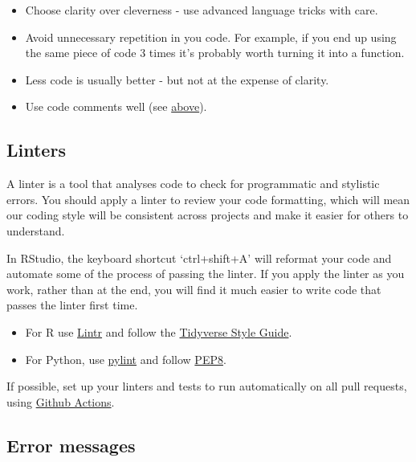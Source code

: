 \documentclass[]{book}
\providecommand{\tightlist}{%
  \setlength{\itemsep}{0pt}\setlength{\parskip}{0pt}}
\begin{document}
\begin{itemize}
\tightlist
\item
  Choose clarity over cleverness - use advanced language tricks with care.
\item
  Avoid unnecessary repetition in you code. For example, if you end up using the same piece of code 3 times it's probably worth turning it into a function.\\
\item
  Less code is usually better - but not at the expense of clarity.\\
\item
  Use code comments well (see \protect\hyperlink{readme}{above}).
\end{itemize}

\hypertarget{linter}{%
\subsection*{Linters}\label{linter}}

A linter is a tool that analyses code to check for programmatic and stylistic errors. You should apply a linter to review your code formatting, which will mean our coding style will be consistent across projects and make it easier for others to understand.

In RStudio, the keyboard shortcut `ctrl+shift+A' will reformat your code and automate some of the process of passing the linter. If you apply the linter as you work, rather than at the end, you will find it much easier to write code that passes the linter first time.

\begin{itemize}
\tightlist
\item
  For R use \href{https://cran.r-project.org/web/packages/lintr/readme/README.html}{Lintr} and follow the \href{https://style.tidyverse.org/index.html}{Tidyverse Style Guide}.\\
\item
  For Python, use \href{http://pylint.pycqa.org/en/latest/}{pylint} and follow \href{https://www.python.org/dev/peps/pep-0008/}{PEP8}.
\end{itemize}

If possible, set up your linters and tests to run automatically on all pull requests, using \href{https://help.github.com/en/actions/automating-your-workflow-with-github-actions}{Github Actions}.

\hypertarget{errors}{%
\subsection*{Error messages}\label{errors}}
\end{document}
